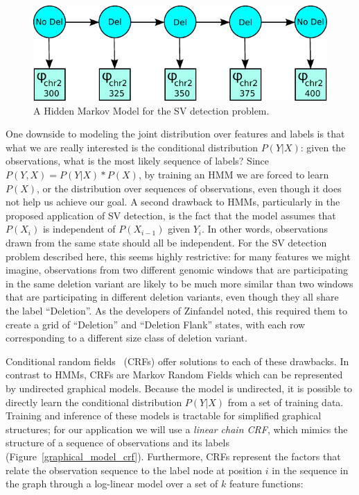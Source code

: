 \begin{figure}
\centering
\includegraphics[width=.8\textwidth]{figures/graphical-model-1.pdf}
\caption[A Hidden Markov Model for the SV detection problem.]{A Hidden Markov Model for the SV detection problem.}
\label{graphical_model_hmm}
\end{figure}

One downside to modeling the joint distribution over features and labels is that what we are really interested is the conditional distribution $P(Y|X)$: given the observations, what is the most likely sequence of labels? Since $P(Y,X) = P(Y|X) * P(X)$, by training an HMM we are forced to learn $P(X)$, or the distribution over sequences of observations, even though it does not help us achieve our goal. A second drawback to HMMs, particularly in the proposed application of SV detection, is the fact that the model assumes that $P(X_i)$ is independent of $P(X_{i-1})$ given $Y_i$. In other words, observations drawn from the same state should all be independent. For the SV detection problem described here, this seems highly restrictive: for many features we might imagine, observations from two different genomic windows that are participating in the same deletion variant are likely to be much more similar than two windows that are participating in different deletion variants, even though they all share the label ``Deletion''. As the developers of Zinfandel noted, this required them to create a grid of ``Deletion'' and ``Deletion Flank'' states, with each row corresponding to a different size class of deletion variant.

Conditional random fields~\cite{Lafferty:2001:CRF:645530.655813} (CRFs) offer solutions to each of these drawbacks. In contrast to HMMs, CRFs are Markov Random Fields which can be represented by undirected graphical models. Because the model is undirected, it is possible to directly learn the conditional distribution $P(Y|X)$ from a set of training data. Training and inference of these models is tractable for simplified graphical structures; for our application we will use a \emph{linear chain CRF}, which mimics the structure of a sequence of observations and its labels (Figure~\ref{graphical_model_crf}). Furthermore, CRFs represent the factors that relate the observation sequence to the label node at position $i$ in the sequence in the graph through a log-linear model over a set of $k$ feature functions:

